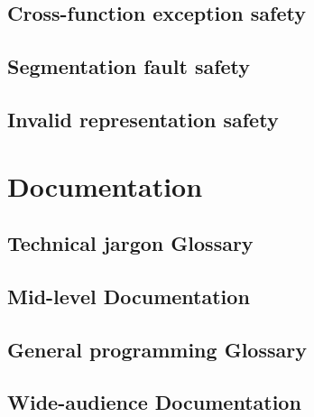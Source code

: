 \documentclass{article}
\begin{document}
\subsection{Cross-function exception safety}
\subsection{Segmentation fault safety}
\subsection{Invalid representation safety}

\section{Documentation}
\subsection{Technical jargon Glossary}
\subsection{Mid-level Documentation}
\subsection{General programming Glossary}
\subsection{Wide-audience Documentation}
\end{document}
